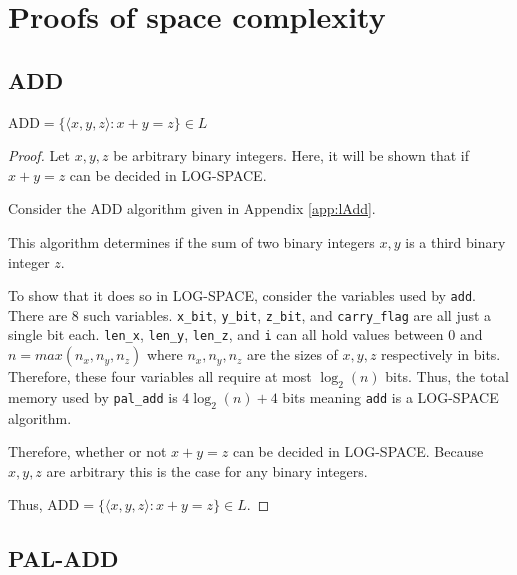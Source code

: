 \documentclass[11pt, a4paper]{article}
\begin{document}


\newpage

\section{Proofs of space complexity}\label{app:proofs}

\subsection{ADD}

\begin{theorem} \label{thrm:add}
    \(\text{ADD} = \{\langle x, y, z \rangle : x + y = z\} \in L\)
\end{theorem}

\begin{proof}
    Let \(x, y, z\) be arbitrary binary integers.
    Here, it will be shown that if \(x + y = z\) can be decided in LOG-SPACE.

    Consider the ADD algorithm given in Appendix \ref{app:lAdd}.

    This algorithm determines if the sum of two binary integers \(x, y\) is a third binary integer \(z\).

    To show that it does so in LOG-SPACE, consider the variables used by \lstinline|add|.
    There are \(8\) such variables.
    \lstinline|x_bit|, \lstinline|y_bit|, \lstinline|z_bit|, and \lstinline|carry_flag| are all just a single bit each.
    \lstinline|len_x|, \lstinline|len_y|, \lstinline|len_z|, and \lstinline|i| can all hold values between \(0\) and \(n = max(n_x, n_y, n_z)\) where \(n_x, n_y, n_z\) are the sizes of \(x, y, z\) respectively in bits.
    Therefore, these four variables all require at most \(\log_2(n)\) bits.
    Thus, the total memory used by \lstinline|pal_add| is \(4\log_2(n) + 4\) bits meaning \lstinline|add| is a LOG-SPACE algorithm.

    Therefore, whether or not \(x + y = z\) can be decided in LOG-SPACE.
    Because \(x, y, z\) are arbitrary this is the case for any binary integers.
    
    Thus, \(\text{ADD} = \{\langle x, y, z \rangle : x + y = z\} \in L\).
\end{proof}

\subsection{PAL-ADD}
\end{document}

